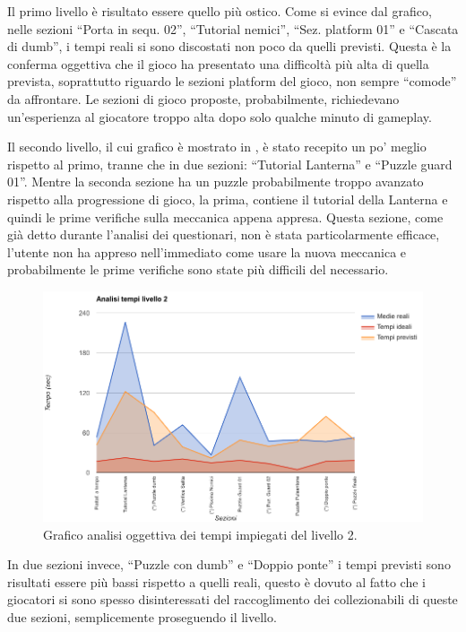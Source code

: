 Il primo livello è risultato essere quello più ostico. Come si evince dal grafico, nelle sezioni ``Porta in sequ. 02'', ``Tutorial nemici'', ``Sez. platform 01'' e ``Cascata di dumb'', i tempi reali si sono discostati non poco da quelli previsti. Questa è la conferma oggettiva che il gioco ha presentato una difficoltà più alta di quella prevista, soprattutto riguardo le sezioni platform del gioco, non sempre ``comode'' da affrontare. Le sezioni di gioco proposte, probabilmente, richiedevano un'esperienza al giocatore troppo alta dopo solo qualche minuto di gameplay.

Il secondo livello, il cui grafico è mostrato in \myfig{\ref{fig:test_analisi_tempi_02}}, è stato recepito un po' meglio rispetto al primo, tranne che in due sezioni: ``Tutorial Lanterna'' e ``Puzzle guard 01''. Mentre la seconda sezione ha un puzzle probabilmente troppo avanzato rispetto alla progressione di gioco, la prima, contiene il tutorial della Lanterna e quindi le prime verifiche sulla meccanica appena appresa. Questa sezione, come già detto durante l'analisi dei questionari, non è stata particolarmente efficace, l'utente non ha appreso nell'immediato come usare la nuova meccanica e probabilmente le prime verifiche sono state più difficili del necessario.

\begin{figure}[h]
\centerline{\includegraphics[scale=0.45]{images/risultati/test_01_analisi_tempi_02.png}}
\caption{Grafico analisi oggettiva dei tempi impiegati del livello 2.}
\label{fig:test_analisi_tempi_02}
\end{figure}

In due sezioni invece, ``Puzzle con dumb'' e ``Doppio ponte'' i tempi previsti sono risultati essere più bassi rispetto a quelli reali, questo è dovuto al fatto che i giocatori si sono spesso disinteressati del raccoglimento dei collezionabili di queste due sezioni, semplicemente proseguendo il livello.

